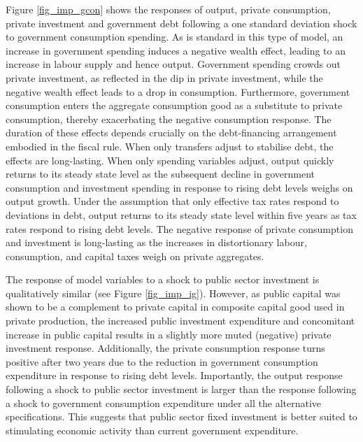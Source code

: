 \documentclass[a4paper,11pt]{article}
\numberwithin{equation}{section}
\begin{document}
	Figure \ref{fig_imp_gcon} shows the responses of output, private consumption, private investment and government debt following a one standard deviation shock to government consumption spending. As is standard in this type of model, an increase in government spending induces a negative wealth effect, leading to an increase in labour supply and hence output. Government spending crowds out private investment, as reflected in the dip in private investment, while the negative wealth effect leads to a drop in consumption. Furthermore, government consumption enters the aggregate consumption good as a substitute to private consumption, thereby exacerbating the negative consumption response. The duration of these effects depends crucially on the debt-financing arrangement embodied in the fiscal rule. When only transfers adjust to stabilise debt, the effects are long-lasting. When only spending variables adjust, output quickly returns to its steady state level as the subsequent decline in government consumption and investment spending in response to rising debt levels weighs on output growth. Under the assumption that only effective tax rates respond to deviations in debt, output returns to its steady state level within five years as tax rates respond to rising debt levels. The negative response of private consumption and investment is long-lasting as the increases in distortionary labour, consumption, and capital taxes weigh on private aggregates.     
	
	The response of model variables to a shock to public sector investment is qualitatively similar (see Figure \ref{fig_imp_ig}). However, as public capital was shown to be a complement to private capital in composite capital good used in private production, the increased public investment expenditure and concomitant increase in public capital results in a slightly more muted (negative) private investment response. Additionally, the private consumption response turns positive after two years due to the reduction in government consumption expenditure in response to rising debt levels. Importantly, the output response following a shock to public sector investment is larger than the response following a shock to government consumption expenditure under all the alternative specifications. This suggests that public sector fixed investment is better suited to stimulating economic activity than current government expenditure.  
	
\end{document}
